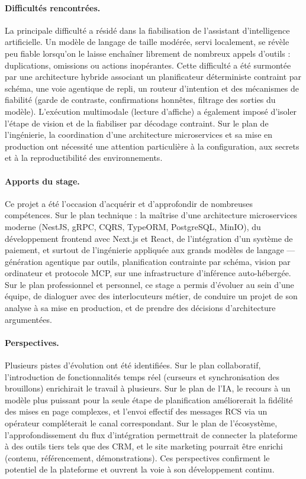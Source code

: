 \paragraph{Difficultés rencontrées.}
La principale difficulté a résidé dans la fiabilisation de l'assistant
d'intelligence artificielle. Un modèle de langage de taille modérée, servi
localement, se révèle peu fiable lorsqu'on le laisse enchaîner librement de
nombreux appels d'outils : duplications, omissions ou actions inopérantes.
Cette difficulté a été surmontée par une architecture hybride associant un
planificateur déterministe contraint par schéma, une voie agentique de
repli, un routeur d'intention et des mécanismes de fiabilité (garde de
contraste, confirmations honnêtes, filtrage des sorties du modèle).
L'exécution multimodale (lecture d'affiche) a également imposé d'isoler
l'étape de vision et de la fiabiliser par décodage contraint. Sur le plan de
l'ingénierie, la coordination d'une architecture microservices et sa mise en
production ont nécessité une attention particulière à la configuration, aux
secrets et à la reproductibilité des environnements.

\paragraph{Apports du stage.}
Ce projet a été l'occasion d'acquérir et d'approfondir de nombreuses
compétences. Sur le plan technique : la maîtrise d'une architecture
microservices moderne (NestJS, gRPC, CQRS, TypeORM, PostgreSQL, MinIO), du
développement frontend avec Next.js et React, de l'intégration d'un système
de paiement, et surtout de l'ingénierie appliquée aux grands modèles de
langage — génération agentique par outils, planification contrainte par
schéma, vision par ordinateur et protocole MCP, sur une infrastructure
d'inférence auto-hébergée. Sur le plan professionnel et personnel, ce stage
a permis d'évoluer au sein d'une équipe, de dialoguer avec des interlocuteurs
métier, de conduire un projet de son analyse à sa mise en production, et de
prendre des décisions d'architecture argumentées.

\paragraph{Perspectives.}
Plusieurs pistes d'évolution ont été identifiées. Sur le plan collaboratif,
l'introduction de fonctionnalités temps réel (curseurs et synchronisation des
brouillons) enrichirait le travail à plusieurs. Sur le plan de l'IA, le
recours à un modèle plus puissant pour la seule étape de planification
améliorerait la fidélité des mises en page complexes, et l'envoi effectif des
messages RCS via un opérateur compléterait le canal correspondant. Sur le
plan de l'écosystème, l'approfondissement du flux d'intégration permettrait
de connecter la plateforme à des outils tiers tels que des CRM, et le site
marketing pourrait être enrichi (contenu, référencement, démonstrations). Ces
perspectives confirment le potentiel de la plateforme et ouvrent la voie à
son développement continu.
